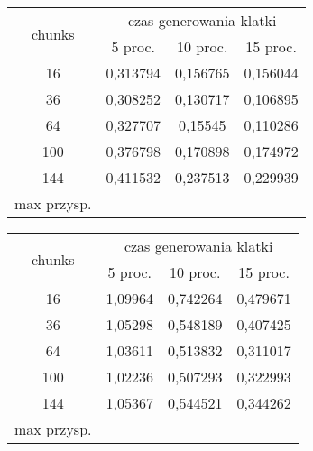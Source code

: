 \begin{figure}[!ht]
\advance\leftskip-2cm
	\begin{subfigure}{.5\textwidth}
\begin{tabular}{|c|c|c|c|} \hline
	    \multirow{2}{*}{chunks} & \multicolumn{3}{|c|}{czas generowania klatki} \\ \cline{2-4}
	 	& 5 proc. & 10 proc. & 15 proc. \\ \hline
	    16 & 0,313794 & 0,156765 & 0,156044 \\ 
	    36 & 0,308252 & 0,130717 & 0,106895 \\
		64 & 0,327707 & 0,15545 & 0,110286 \\
		100 & 0,376798 & 0,170898 & 0,174972 \\
		144 & 0,411532 & 0,237513 & 0,229939 \\ \hline
		max przysp. & & & \\
		\hline
\end{tabular}
	\end{subfigure}
	\hspace{2cm}
	\begin{subfigure}{.5\textwidth}
\begin{tabular}{|c|c|c|c|} \hline
	    \multirow{2}{*}{chunks} & \multicolumn{3}{|c|}{czas generowania klatki} \\ \cline{2-4}
	 	& 5 proc. & 10 proc. & 15 proc. \\ \hline
	    16 & 1,09964 & 0,742264 & 0,479671 \\ 
	    36 & 1,05298 & 0,548189 & 0,407425 \\
		64 & 1,03611 & 0,513832 & 0,311017 \\
		100 & 1,02236 & 0,507293 & 0,322993 \\
		144 & 1,05367 & 0,544521 & 0,344262 \\ \hline
		max przysp. & & & \\
		\hline
\end{tabular}
	\end{subfigure}
\end{figure}
